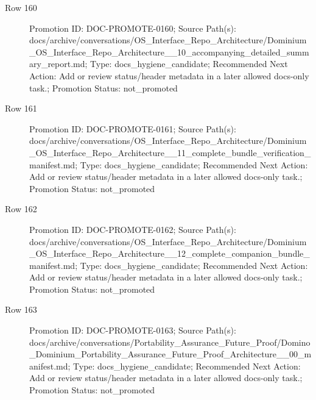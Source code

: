 \documentclass[9pt,a4paper,openany]{book}
\begin{document}
\begin{description}
\item[Row 160] Promotion ID: DOC-\allowbreak{}PROMOTE-\allowbreak{}0160; Source Path(s): docs/\allowbreak{}archive/\allowbreak{}conversations/\allowbreak{}OS\_\allowbreak{}Interface\_\allowbreak{}Repo\_\allowbreak{}Architecture/\allowbreak{}Dominium\_\allowbreak{}OS\_\allowbreak{}Interface\_\allowbreak{}Repo\_\allowbreak{}Architecture\_\allowbreak{}\_\allowbreak{}10\_\allowbreak{}accompanying\_\allowbreak{}detailed\_\allowbreak{}summary\_\allowbreak{}report.\allowbreak{}md; Type: docs\_\allowbreak{}hygiene\_\allowbreak{}candidate; Recommended Next Action: Add or review status/\allowbreak{}header metadata in a later allowed docs-\allowbreak{}only task.\allowbreak{}; Promotion Status: not\_\allowbreak{}promoted
\item[Row 161] Promotion ID: DOC-\allowbreak{}PROMOTE-\allowbreak{}0161; Source Path(s): docs/\allowbreak{}archive/\allowbreak{}conversations/\allowbreak{}OS\_\allowbreak{}Interface\_\allowbreak{}Repo\_\allowbreak{}Architecture/\allowbreak{}Dominium\_\allowbreak{}OS\_\allowbreak{}Interface\_\allowbreak{}Repo\_\allowbreak{}Architecture\_\allowbreak{}\_\allowbreak{}11\_\allowbreak{}complete\_\allowbreak{}bundle\_\allowbreak{}verification\_\allowbreak{}manifest.\allowbreak{}md; Type: docs\_\allowbreak{}hygiene\_\allowbreak{}candidate; Recommended Next Action: Add or review status/\allowbreak{}header metadata in a later allowed docs-\allowbreak{}only task.\allowbreak{}; Promotion Status: not\_\allowbreak{}promoted
\item[Row 162] Promotion ID: DOC-\allowbreak{}PROMOTE-\allowbreak{}0162; Source Path(s): docs/\allowbreak{}archive/\allowbreak{}conversations/\allowbreak{}OS\_\allowbreak{}Interface\_\allowbreak{}Repo\_\allowbreak{}Architecture/\allowbreak{}Dominium\_\allowbreak{}OS\_\allowbreak{}Interface\_\allowbreak{}Repo\_\allowbreak{}Architecture\_\allowbreak{}\_\allowbreak{}12\_\allowbreak{}complete\_\allowbreak{}companion\_\allowbreak{}bundle\_\allowbreak{}manifest.\allowbreak{}md; Type: docs\_\allowbreak{}hygiene\_\allowbreak{}candidate; Recommended Next Action: Add or review status/\allowbreak{}header metadata in a later allowed docs-\allowbreak{}only task.\allowbreak{}; Promotion Status: not\_\allowbreak{}promoted
\item[Row 163] Promotion ID: DOC-\allowbreak{}PROMOTE-\allowbreak{}0163; Source Path(s): docs/\allowbreak{}archive/\allowbreak{}conversations/\allowbreak{}Portability\_\allowbreak{}Assurance\_\allowbreak{}Future\_\allowbreak{}Proof/\allowbreak{}Domino\_\allowbreak{}Dominium\_\allowbreak{}Portability\_\allowbreak{}Assurance\_\allowbreak{}Future\_\allowbreak{}Proof\_\allowbreak{}Architecture\_\allowbreak{}\_\allowbreak{}00\_\allowbreak{}manifest.\allowbreak{}md; Type: docs\_\allowbreak{}hygiene\_\allowbreak{}candidate; Recommended Next Action: Add or review status/\allowbreak{}header metadata in a later allowed docs-\allowbreak{}only task.\allowbreak{}; Promotion Status: not\_\allowbreak{}promoted

\end{description}
\end{document}
